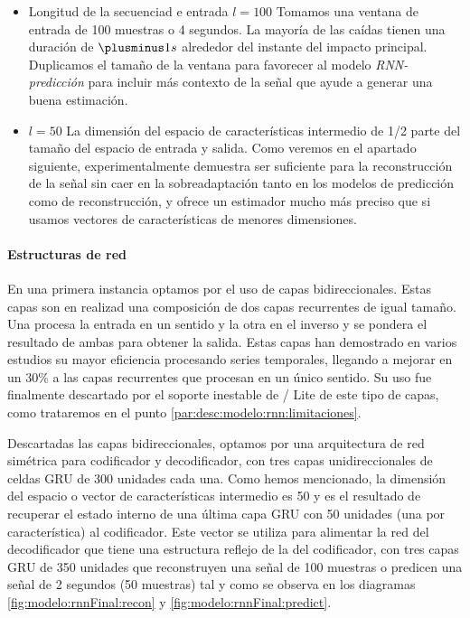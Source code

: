 \begin{itemize}
  \item Longitud de la secuenciad e entrada $l=100$ Tomamos una ventana de entrada de 100 muestras o 4 segundos. La mayoría de las caídas tienen una duración de $\plusminus1s$ \cite{Sucerquia2017,Liu2018,Hassan2019} alrededor del instante del impacto principal. Duplicamos el tamaño de la ventana para favorecer al modelo \textit{RNN-predicción} para incluir más contexto de la señal que ayude a generar una buena estimación.
  \item $l=50$ La dimensión del espacio de características intermedio de 1/2 parte del tamaño del espacio de entrada y salida. Como veremos en el apartado siguiente, experimentalmente demuestra ser suficiente para la reconstrucción de la señal sin caer en la sobreadaptación tanto en los modelos de predicción como de reconstrucción, y ofrece un estimador mucho más preciso que si usamos vectores de características de menores dimensiones.
\end{itemize}

\paragraph{Estructuras de red}
En una primera instancia optamos por el uso de capas bidireccionales\cite{Schuster1997}. Estas capas son en realizad una composición de dos capas recurrentes de igual tamaño. Una procesa la entrada en un sentido y la otra en el inverso y se pondera el resultado de ambas para obtener la salida. Estas capas han demostrado en varios estudios \cite{Zaho2017, Su2018} su mayor eficiencia procesando series temporales, llegando a mejorar en un 30\% a las capas recurrentes que procesan en un único sentido. Su uso fue finalmente descartado por el soporte inestable de \tensorflow/ Lite de este tipo de capas, como trataremos en el punto \ref{par:desc:modelo:rnn:limitaciones}.

Descartadas las capas bidireccionales, optamos por una arquitectura de red simétrica para codificador y decodificador, con tres capas unidireccionales de celdas GRU de 300 unidades cada una. Como hemos mencionado, la dimensión del espacio o vector de características intermedio es 50 y es el resultado de recuperar el estado interno de una última capa GRU con 50 unidades (una por característica) al codificador. Este vector se utiliza para alimentar la red del decodificador que tiene una estructura reflejo de la del codificador, con tres capas GRU de 350 unidades que reconstruyen una señal de 100 muestras o predicen una señal de 2 segundos (50 muestras) tal y como se observa en los diagramas \ref{fig:modelo:rnnFinal:recon} y \ref{fig:modelo:rnnFinal:predict}.

